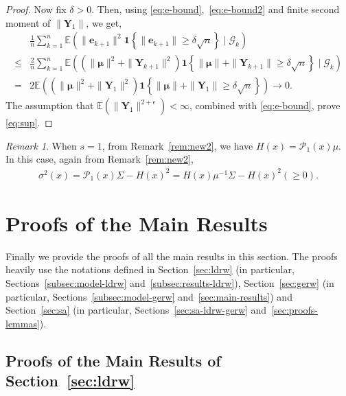 \documentclass[12pt]{amsart}
\theoremstyle{plain}
\theoremstyle{remark}
\newtheorem{remark}[theorem]{Remark}
\numberwithin{equation}{section}
\begin{document}
\begin{proof}
Now fix $\delta > 0$. Then, using \eqref{eq:e-bound},~\eqref{eq:e-bound2} and finite second moment of $\|\boldsymbol{Y}_1\|$, we get,
\begin{align*}%
&\frac{1}{n}\sum_{k=1}^{n}\mathbb{E}\left( \|\boldsymbol{e}_{k+1}\|^2 \mathbf{1}\left\{\|\boldsymbol{e}_{k+1}\| \geq \delta\sqrt{n}\right\}\mid \mathcal{G}_{k}\right) \nonumber
\\ \leq& \frac{2}{n}\sum_{k=1}^{n}\mathbb{E}\left( \left(\|\boldsymbol{\mu}\|^2 + \|\boldsymbol{Y}_{k+1}\|^2\right) \mathbf{1}\left\{\|\boldsymbol{\mu}\| + \|\boldsymbol{Y}_{k+1}\| \geq \delta\sqrt{n}\right\}\mid \mathcal{G}_{k}\right) \nonumber
\\ =& 2\mathbb{E}\left( \left(\|\boldsymbol{\mu}\|^2 + \|\boldsymbol{Y}_{1}\|^2\right) \mathbf{1}\left\{\|\boldsymbol{\mu}\| + \|\boldsymbol{Y}_{1}\| \geq \delta\sqrt{n}\right\}\right) \to 0. \nonumber
\end{align*}
{The assumption that $\mathbb{E}\left(\|\boldsymbol{Y}_1\|^{2+\epsilon}\right) < \infty$, combined with \eqref{eq:e-bound}, prove \eqref{eq:sup}.}
\end{proof}

\begin{remark}
    When $s=1$, from Remark~\ref{rem:new2}, we have $H(x) = \mathcal{P}_1(x)\mu$. In this case, again from Remark~\ref{rem:new2}, 
    \begin{align}\label{eq:new1}
        \sigma^2(x) = \mathcal{P}_1(x)\Sigma - H(x)^2 = H(x)\mu^{-1}\Sigma - H(x)^2 (\geq 0).
    \end{align}
\end{remark}



\section{Proofs of the Main Results}\label{sec:proofs} 

Finally we provide the proofs of all the main results in this section. The proofs heavily use the notations defined in Section~\ref{sec:ldrw} (in particular, Sections~\ref{subsec:model-ldrw} and~\ref{subsec:results-ldrw}), Section~\ref{sec:gerw} (in particular, Sections~\ref{subsec:model-gerw} and~\ref{sec:main-results}) and Section~\ref{sec:sa} (in particular, Sections~\ref{sec:sa-ldrw-gerw} and~\ref{sec:proofs-lemmas}).

\subsection{Proofs of the Main Results of Section~\ref{sec:ldrw}}\label{sec:proofs-ldrw}
\end{document}
